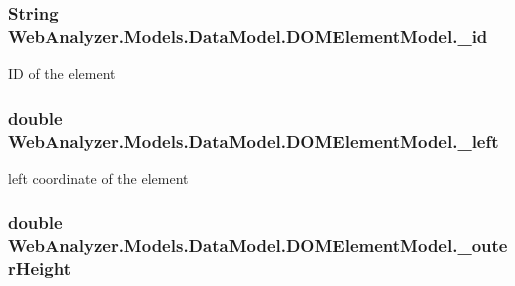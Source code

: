\subsubsection[{\+\_\+id}]{\setlength{\rightskip}{0pt plus 5cm}String Web\+Analyzer.\+Models.\+Data\+Model.\+D\+O\+M\+Element\+Model.\+\_\+id\hspace{0.3cm}{\ttfamily [private]}}\label{class_web_analyzer_1_1_models_1_1_data_model_1_1_d_o_m_element_model_a4f824d5be5dd68766e0a50d5f27a8dfc}


I\+D of the element 

\hypertarget{class_web_analyzer_1_1_models_1_1_data_model_1_1_d_o_m_element_model_aeb026965e7f90ea485c57b8b78d019b0}{}
\subsubsection[{\+\_\+left}]{\setlength{\rightskip}{0pt plus 5cm}double Web\+Analyzer.\+Models.\+Data\+Model.\+D\+O\+M\+Element\+Model.\+\_\+left\hspace{0.3cm}{\ttfamily [private]}}\label{class_web_analyzer_1_1_models_1_1_data_model_1_1_d_o_m_element_model_aeb026965e7f90ea485c57b8b78d019b0}


left coordinate of the element 

\hypertarget{class_web_analyzer_1_1_models_1_1_data_model_1_1_d_o_m_element_model_a4d8c5283f4625e042bb2a98cdec323ce}{}
\subsubsection[{\+\_\+outer\+Height}]{\setlength{\rightskip}{0pt plus 5cm}double Web\+Analyzer.\+Models.\+Data\+Model.\+D\+O\+M\+Element\+Model.\+\_\+outer\+Height\hspace{0.3cm}{\ttfamily [private]}}\label{class_web_analyzer_1_1_models_1_1_data_model_1_1_d_o_m_element_model_a4d8c5283f4625e042bb2a98cdec323ce}


